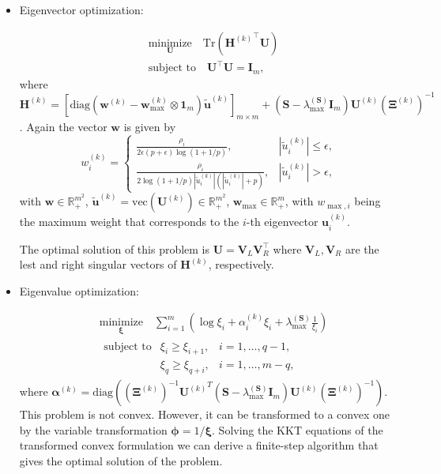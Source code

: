 \documentclass[]{article}
\begin{document}
\begin{itemize}
\item
  Eigenvector optimization:

  \[\begin{aligned}
      &\underset{\mathbf{U}}{\text{minimize}}\quad \text{Tr}\left({\mathbf{H}^{(k)}}^\top\mathbf{U}\right)\\
      &\text{subject to}\quad \mathbf{U}^\top\mathbf{U}=\mathbf{I}_m,
  \end{aligned}\] where
  \(\mathbf{H}^{(k)}=\left[\text{diag}\left(\mathbf{w}^{(k)}-\mathbf{w}_{\max}^{(k)}\otimes\mathbf{1}_{m}\right)\mathbf{\tilde{u}}^{(k)}\right]_{m\times m} + \left(\mathbf{S}-\lambda_{\max}^{(\mathbf{S})}\mathbf{I}_m\right) \mathbf{U}^{(k)} \left(\mathbf{\Xi}^{(k)}\right)^{-1}\).
  Again the vector \(\mathbf{w}\) is given by
  \[w_{i}^{(k)}= \begin{cases}
      \frac{\rho_i}{2\epsilon(p+\epsilon)\log(1+1/p)},& |\tilde{u}^{(k)}_{i}|\leq\epsilon,\\
      \frac{\rho_i}{2\log(1+1/p)|\tilde{u}^{(k)}_{i}|\left(|\tilde{u}^{(k)}_{i}|+p\right)},&                |\tilde{u}^{(k)}_{i}|>\epsilon,
      \end{cases}\] with \(\mathbf{w}\in\mathbb{R}_+^{m^2}\),
  \(\mathbf{\tilde{u}}^{(k)} = \text{vec}(\mathbf{U}^{(k)})\in\mathbb{R}_+^{m^2}\),
  \(\mathbf{w}_{\max}\in\mathbb{R}^m_+\), with \(w_{\max,i}\) being the
  maximum weight that corresponds to the \(i\)-th eigenvector
  \(\mathbf{u}^{(k)}_{i}\).

  The optimal solution of this problem is
  \(\mathbf{U} = \mathbf{V}_L\mathbf{V}_R^\top\) where
  \(\mathbf{V}_L, \mathbf{V}_R\) are the lest and right singular vectors
  of \(\mathbf{H}^{(k)}\), respectively.
\item
  Eigenvalue optimization:

  \[\begin{aligned}
      &\underset{\mathbf{\xi}}{\text{minimize}}\quad \sum_{i=1}^{m}\left(\log\xi_i+\alpha_i^{(k)}\xi_i+\lambda_{\max}^{(\mathbf{S})}\frac{1}{\xi_i}\right)\\
      &\!\begin{array}{lll}
      \text{subject to} & \xi_{i}\geq \xi_{i+1}, & i=1,\dots, q-1,\\
       & \xi_{q}\geq \xi_{q+i}, & i=1,\dots,m-q,
      \end{array}
  \end{aligned}\] where
  \(\mathbf{\alpha}^{(k)} = \text{diag}\left(\left(\mathbf{\Xi}^{(k)}\right)^{-1} {\mathbf{U}^{(k)}}^T \left(\mathbf{S}-\lambda_{\max}^{(\mathbf{S})}\mathbf{I}_m\right) \mathbf{U}^{(k)} \left(\mathbf{\Xi}^{(k)}\right)^{-1}\right)\).
  This problem is not convex. However, it can be transformed to a convex
  one by the variable transformation \(\mathbf{\phi} = 1/\mathbf{\xi}\).
  Solving the KKT equations of the transformed convex formulation we can
  derive a finite-step algorithm that gives the optimal solution of the
  problem.
\end{itemize}
\end{document}
